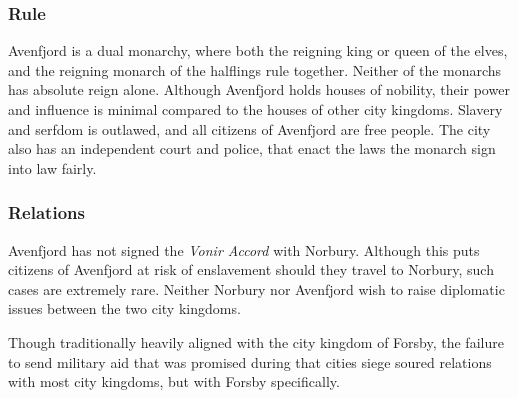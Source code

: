 \subsubsection{Rule}

Avenfjord is a dual monarchy, where both the reigning king or queen of the
elves, and the reigning monarch of the halflings rule together. Neither of
the monarchs has absolute reign alone. Although Avenfjord holds houses of
nobility, their power and influence is minimal compared to the houses of
other city kingdoms. Slavery and serfdom is outlawed, and all citizens of
Avenfjord are free people. The city also has an independent court and police,
that enact the laws the monarch sign into law fairly.

\subsubsection{Relations}

Avenfjord has not signed the \emph{Vonir Accord} with Norbury. Although this
puts citizens of Avenfjord at risk of enslavement should they travel to
Norbury, such cases are extremely rare. Neither Norbury nor Avenfjord wish
to raise diplomatic issues between the two city kingdoms.

Though traditionally heavily aligned with the city kingdom of Forsby, the
failure to send military aid that was promised during that cities siege
soured relations with most city kingdoms, but with Forsby specifically.
